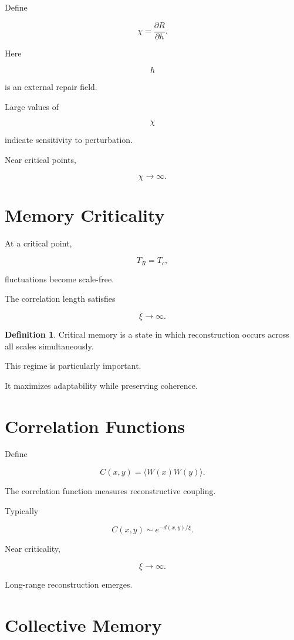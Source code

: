 \documentclass[12pt,oneside]{book}
\theoremstyle{plain} \newtheorem{theorem}{Theorem}[chapter] \newtheorem{lemma}[theorem]{Lemma} \newtheorem{proposition}[theorem]{Proposition} \newtheorem{corollary}[theorem]{Corollary}
\theoremstyle{definition} \newtheorem{definition}[theorem]{Definition} \newtheorem{axiom}[theorem]{Axiom} \newtheorem{construction}[theorem]{Construction}
\theoremstyle{remark} \newtheorem{remark}[theorem]{Remark} \newtheorem{example}[theorem]{Example}
\begin{document}
Define

\[
\chi
=
\frac{\partial R}
{\partial h}.
\]

Here

\[
h
\]

is an external repair field.

Large values of

\[
\chi
\]

indicate sensitivity to perturbation.

Near critical points,

\[
\chi
\rightarrow
\infty.
\]

\section{Memory Criticality}

At a critical point,

\[
T_R
=
T_c,
\]

fluctuations become scale-free.

The correlation length satisfies

\[
\xi
\rightarrow
\infty.
\]

\begin{definition}

Critical memory is a state in which reconstruction occurs across all scales simultaneously.

\end{definition}

This regime is particularly important.

It maximizes adaptability while preserving coherence.

\section{Correlation Functions}

Define

\[
C(x,y)
=
\langle
W(x)W(y)
\rangle.
\]

The correlation function measures reconstructive coupling.

Typically

\[
C(x,y)
\sim
e^{-d(x,y)/\xi}.
\]

Near criticality,

\[
\xi
\rightarrow
\infty.
\]

Long-range reconstruction emerges.

\section{Collective Memory}
\end{document}
